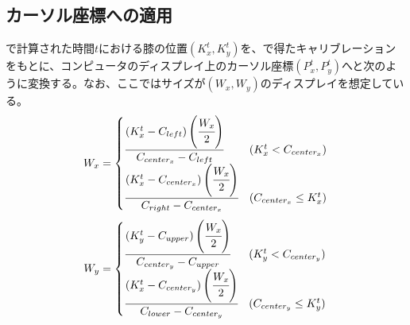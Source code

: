 \subsection{カーソル座標への適用}
で計算された時間$t$における膝の位置$(K^t_x, K^t_y)$を、で得たキャリブレーションをもとに、コンピュータのディスプレイ上のカーソル座標$(P^t_x, P^t_y)$へと次のように変換する。なお、ここではサイズが$(W_x, W_y)$のディスプレイを想定している。
\begin{eqnarray}
	W_x = 
	\begin{cases}
		\cfrac{(K^t_x - C_{left}) \left( \cfrac{W_x}{2} \right)}{C_{center_x} - C_{left}} & (K^t_x < C_{center_x})\\
		\cfrac{(K^t_x - C_{center_x}) \left( \cfrac{W_x}{2} \right)}{C_{right} - C_{center_x}} & (C_{center_x} \leq K^t_x)
	\end{cases}	 
\end{eqnarray}
\begin{eqnarray}
	W_y = 
	\begin{cases}
		\cfrac{(K^t_y - C_{upper}) \left( \cfrac{W_x}{2} \right)}{C_{center_y} - C_{upper}} & (K^t_y < C_{center_y}) \\
		\cfrac{(K^t_x - C_{center_y}) \left( \cfrac{W_x}{2} \right)}{C_{lower} - C_{center_y}} & (C_{center_y} \leq K^t_y)
	\end{cases}
\end{eqnarray}



